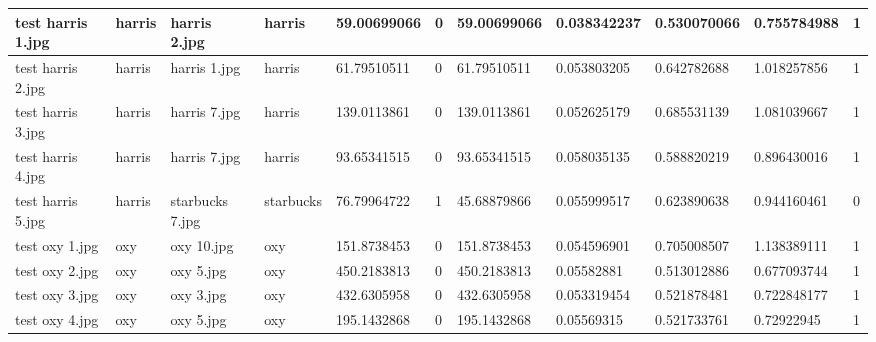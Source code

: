 \begin{landscape}
\begin{longtable}{|p{2cm}|p{1.5cm}|p{2cm}|p{1.5cm}|p{2cm}|p{1cm}|p{2cm}|p{2cm}|p{2cm}|p{2cm}|p{1cm}|}
		test harris 1.jpg    & harris           & harris 2.jpg          & harris                      & 59.00699066           & 0                       & 59.00699066                & 0.038342237           & 0.530070066           & 0.755784988              & 1                \\ \hline
		test harris 2.jpg    & harris           & harris 1.jpg          & harris                      & 61.79510511           & 0                       & 61.79510511                & 0.053803205           & 0.642782688           & 1.018257856              & 1                \\ \hline
		test harris 3.jpg    & harris           & harris 7.jpg          & harris                      & 139.0113861           & 0                       & 139.0113861                & 0.052625179           & 0.685531139           & 1.081039667              & 1                \\ \hline
		test harris 4.jpg    & harris           & harris 7.jpg          & harris                      & 93.65341515           & 0                       & 93.65341515                & 0.058035135           & 0.588820219           & 0.896430016              & 1                \\ \hline
		test harris 5.jpg    & harris           & starbucks 7.jpg       & starbucks                   & 76.79964722           & 1                       & 45.68879866                & 0.055999517           & 0.623890638           & 0.944160461              & 0                \\ \hline
		test oxy 1.jpg       & oxy              & oxy 10.jpg            & oxy                         & 151.8738453           & 0                       & 151.8738453                & 0.054596901           & 0.705008507           & 1.138389111              & 1                \\ \hline
		test oxy 2.jpg       & oxy              & oxy 5.jpg             & oxy                         & 450.2183813           & 0                       & 450.2183813                & 0.05582881            & 0.513012886           & 0.677093744              & 1                \\ \hline
		test oxy 3.jpg       & oxy              & oxy 3.jpg             & oxy                         & 432.6305958           & 0                       & 432.6305958                & 0.053319454           & 0.521878481           & 0.722848177              & 1                \\ \hline
		test oxy 4.jpg       & oxy              & oxy 5.jpg             & oxy                         & 195.1432868           & 0                       & 195.1432868                & 0.05569315            & 0.521733761           & 0.72922945               & 1                \\ \hline

\end{longtable}
\end{landscape}
